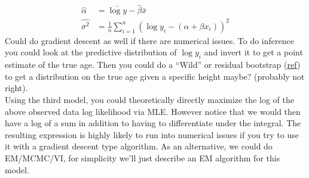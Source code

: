 \documentclass{article}
\begin{document}
\begin{itemize}
\begin{enumerate}[label=(\alph*)]
\begin{align*}
        \hat{\alpha} &= \bar{\log y} - \hat{\beta} \bar{x} \\
        \widehat{\sigma^2} &= \frac{1}{n}\sum_{i=1}^{n}(\log y_i - (\alpha + \beta x_i))^2
      \end{align*}
      Could do gradient descent as well if there are numerical issues. To do inference you could look at the predictive distribution of $\log y_i$ and invert it to get a point estimate of
      the true age. Then you could do a ``Wild'' or residual bootstrap (\href{https://faculty.washington.edu/yenchic/17Sp_403/Lec6-bootstrap_reg.pdf}{ref}) to get a distribution on the true age given a specific height maybe? (probably not right).\\

      Using the third model, you could theoretically directly maximize the log of the above observed data log likelihood via MLE. However notice that we would then have a log of a sum in addition to having to differentiate under the integral. The resulting
      expression is highly likely to run into numerical issues if you try to use it with a gradient descent type algorithm.
      As an alternative, we could do EM/MCMC/VI, for simplicity we'll just describe an EM algorithm for this model.\\


\end{enumerate}
\end{itemize}
\end{document}
